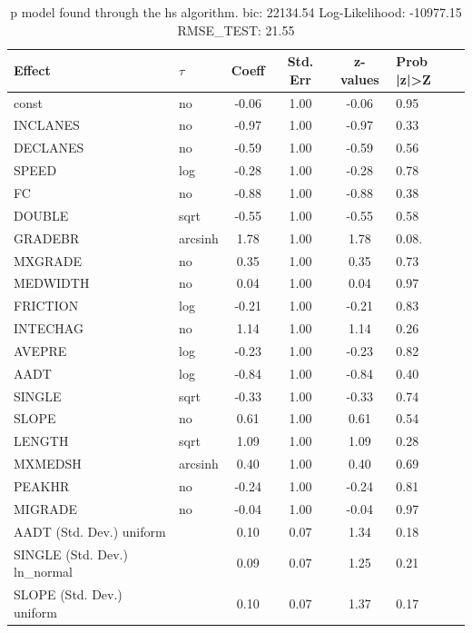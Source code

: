 \begin{table}
	\caption{p model found through the hs algorithm. bic: 22134.54 Log-Likelihood: -10977.15 RMSE_TEST: 21.55}
	\begin{center}
		\begin{tabular}{|l|l|c|c|c|l|}
			\hline
			Effect & $\tau$ & Coeff & Std. Err & z-values & Prob |z|>Z \\
			\hline
			const & no & -0.06 & 1.00 & -0.06 & 0.95 \\
			\hline
			INCLANES & no & -0.97 & 1.00 & -0.97 & 0.33 \\
			\hline
			DECLANES & no & -0.59 & 1.00 & -0.59 & 0.56 \\
			\hline
			SPEED & log & -0.28 & 1.00 & -0.28 & 0.78 \\
			\hline
			FC & no & -0.88 & 1.00 & -0.88 & 0.38 \\
			\hline
			DOUBLE & sqrt & -0.55 & 1.00 & -0.55 & 0.58 \\
			\hline
			GRADEBR & arcsinh & 1.78 & 1.00 & 1.78 & 0.08. \\
			\hline
			MXGRADE & no & 0.35 & 1.00 & 0.35 & 0.73 \\
			\hline
			MEDWIDTH & no & 0.04 & 1.00 & 0.04 & 0.97 \\
			\hline
			FRICTION & log & -0.21 & 1.00 & -0.21 & 0.83 \\
			\hline
			INTECHAG & no & 1.14 & 1.00 & 1.14 & 0.26 \\
			\hline
			AVEPRE & log & -0.23 & 1.00 & -0.23 & 0.82 \\
			\hline
			AADT & log & -0.84 & 1.00 & -0.84 & 0.40 \\
			\hline
			SINGLE & sqrt & -0.33 & 1.00 & -0.33 & 0.74 \\
			\hline
			SLOPE & no & 0.61 & 1.00 & 0.61 & 0.54 \\
			\hline
			LENGTH & sqrt & 1.09 & 1.00 & 1.09 & 0.28 \\
			\hline
			MXMEDSH & arcsinh & 0.40 & 1.00 & 0.40 & 0.69 \\
			\hline
			PEAKHR & no & -0.24 & 1.00 & -0.24 & 0.81 \\
			\hline
			MIGRADE & no & -0.04 & 1.00 & -0.04 & 0.97 \\
			\hline
			AADT (Std. Dev.) uniform &  & 0.10 & 0.07 & 1.34 & 0.18 \\
			\hline
			SINGLE (Std. Dev.) ln_normal &  & 0.09 & 0.07 & 1.25 & 0.21 \\
			\hline
			SLOPE (Std. Dev.) uniform &  & 0.10 & 0.07 & 1.37 & 0.17 \\

\end{tabular}
\end{center}
\end{table}
